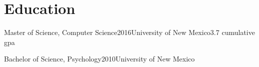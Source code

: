 \documentclass[print]{friggeri-cv} %
\begin{document}
\iftoggle{cv}{
  \begin{description}
    \item  {\largeheaderfont Student Volunteer } \smallheaderfont{\hfill 2008\textemdash 2010} \\*
          {\footnotesize \emph{The Mind Research Network, Albuquerque, NM}} \hfill \\*
          Assisted with a study ran by Pilar Sanjuan, PhD investigating substance use
          and post-traumatic stress disorder (PTSD) in recently returned combat
          veterans. \\*
  \end{description}


  \begin{description}
    \item  \largeheaderfont{Student Volunteer}  \hfill {\smallheaderfont 2008 } \\*
          {\footnotesize \emph{The University of New Mexico, Albuquerque, NM}\textemdash } \\*
          Assisted Akaysha Tang, PhD, with a study investigating stress regulation in
          rats and assisted an expert in troubleshooting and repairing an EEG system
          for a study investigating stress in humans.\\*
  \end{description}
}{} %

\section{Education}
\begin{edu}{Master of Science, Computer Science}{2016}{University of New Mexico}{3.7 cumulative gpa}
\end{edu}
\begin{edu}{Bachelor of Science, Psychology}{2010}{University of New Mexico}{}
\end{edu}
\end{document}
